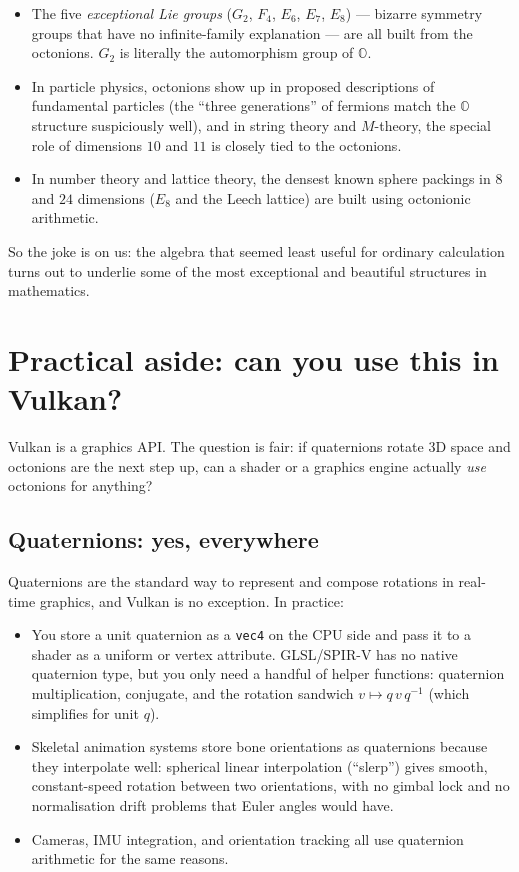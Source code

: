 \documentclass[11pt]{article}
\newcommand{\OO}{\mathbb{O}}
\begin{document}
\begin{itemize}[leftmargin=*, itemsep=2pt]
  \item The five \emph{exceptional Lie groups} ($G_2$, $F_4$,
        $E_6$, $E_7$, $E_8$) --- bizarre symmetry groups that have
        no infinite-family explanation --- are all built from the
        octonions. $G_2$ is literally the automorphism group of
        $\OO$.
  \item In particle physics, octonions show up in proposed
        descriptions of fundamental particles (the
        ``three generations'' of fermions match the $\OO$
        structure suspiciously well), and in string theory and
        $M$-theory, the special role of dimensions $10$ and $11$
        is closely tied to the octonions.
  \item In number theory and lattice theory, the densest known
        sphere packings in $8$ and $24$ dimensions ($E_8$ and the
        Leech lattice) are built using octonionic arithmetic.
\end{itemize}

So the joke is on us: the algebra that seemed least useful for
ordinary calculation turns out to underlie some of the most
exceptional and beautiful structures in mathematics.

\section*{Practical aside: can you use this in Vulkan?}

Vulkan is a graphics API. The question is fair: if quaternions
rotate $3$D space and octonions are the next step up, can a shader
or a graphics engine actually \emph{use} octonions for anything?

\subsection*{Quaternions: yes, everywhere}

Quaternions are the standard way to represent and compose rotations
in real-time graphics, and Vulkan is no exception. In practice:

\begin{itemize}[leftmargin=*, itemsep=2pt]
  \item You store a unit quaternion as a \texttt{vec4} on the CPU
        side and pass it to a shader as a uniform or vertex
        attribute. GLSL/SPIR-V has no native quaternion type, but
        you only need a handful of helper functions: quaternion
        multiplication, conjugate, and the rotation sandwich
        $v \mapsto q\,v\,q^{-1}$ (which simplifies for unit $q$).
  \item Skeletal animation systems store bone orientations as
        quaternions because they interpolate well: spherical linear
        interpolation (``slerp'') gives smooth, constant-speed
        rotation between two orientations, with no gimbal lock and
        no normalisation drift problems that Euler angles would have.
  \item Cameras, IMU integration, and orientation tracking all use
        quaternion arithmetic for the same reasons.
\end{itemize}
\end{document}
